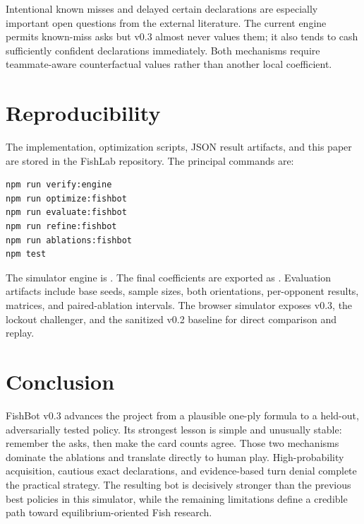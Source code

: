 \documentclass[11pt]{article}
\begin{document}
Intentional known misses and delayed certain declarations are especially important open questions from the external literature. The current engine permits known-miss asks but v0.3 almost never values them; it also tends to cash sufficiently confident declarations immediately. Both mechanisms require teammate-aware counterfactual values rather than another local coefficient.

\section{Reproducibility}

The implementation, optimization scripts, JSON result artifacts, and this paper are stored in the FishLab repository. The principal commands are:

\begin{verbatim}
npm run verify:engine
npm run optimize:fishbot
npm run evaluate:fishbot
npm run refine:fishbot
npm run ablations:fishbot
npm test
\end{verbatim}

The simulator engine is . The final coefficients are exported as . Evaluation artifacts include base seeds, sample sizes, both orientations, per-opponent results, matrices, and paired-ablation intervals. The browser simulator exposes v0.3, the lockout challenger, and the sanitized v0.2 baseline for direct comparison and replay.

\section{Conclusion}

FishBot v0.3 advances the project from a plausible one-ply formula to a held-out, adversarially tested policy. Its strongest lesson is simple and unusually stable: remember the asks, then make the card counts agree. Those two mechanisms dominate the ablations and translate directly to human play. High-probability acquisition, cautious exact declarations, and evidence-based turn denial complete the practical strategy. The resulting bot is decisively stronger than the previous best policies in this simulator, while the remaining limitations define a credible path toward equilibrium-oriented Fish research.
\end{document}
